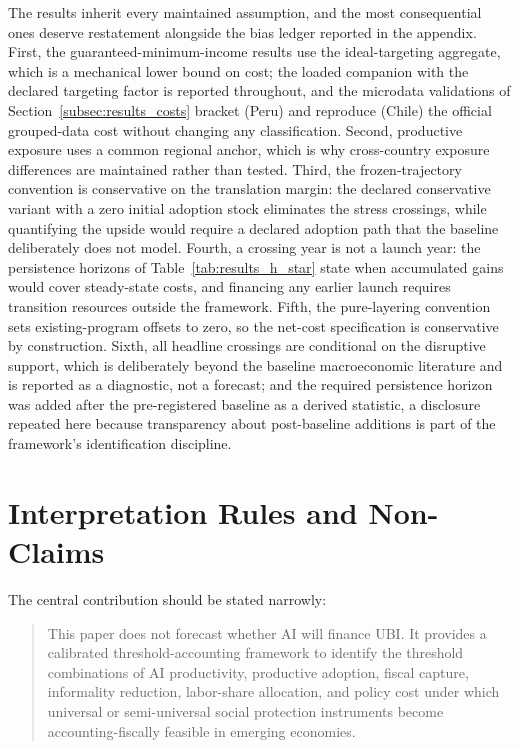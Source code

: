 \documentclass[11pt,a4paper]{article}
\begin{document}
The results inherit every maintained assumption, and the most consequential ones deserve
restatement alongside the bias ledger reported in the
appendix. First, the guaranteed-minimum-income results use the ideal-targeting aggregate,
which is a mechanical lower bound on cost; the loaded companion with the declared targeting
factor is reported throughout, and the microdata validations of Section~\ref{subsec:results_costs} bracket
(Peru) and reproduce (Chile) the official grouped-data cost without changing any
classification. Second, productive exposure uses a common regional anchor, which
is why cross-country exposure differences are maintained rather than tested. Third, the
frozen-trajectory convention is conservative on the translation margin: the declared
conservative variant with a zero initial adoption stock eliminates the stress crossings,
while quantifying the upside would require a declared adoption path that the baseline
deliberately does not model. Fourth, a crossing year is not a launch year: the persistence
horizons of Table~\ref{tab:results_h_star} state when accumulated gains would cover
steady-state costs, and financing any earlier launch requires transition resources outside
the framework. Fifth, the pure-layering convention sets existing-program offsets to zero,
so the net-cost specification is conservative by construction. Sixth, all headline
crossings are conditional on the disruptive support, which is deliberately beyond the
baseline macroeconomic literature and is reported as a diagnostic, not a forecast; and the
required persistence horizon was added after the pre-registered baseline as a derived
statistic, a disclosure repeated here because transparency about post-baseline additions is
part of the framework's identification discipline.

\section{Interpretation Rules and Non-Claims}\label{sec:claims}

The central contribution should be stated narrowly:
\begin{quote}
This paper does not forecast whether AI will finance UBI. It provides a calibrated threshold-accounting framework to identify the threshold combinations of AI productivity, productive adoption, fiscal capture, informality reduction, labor-share allocation, and policy cost under which universal or semi-universal social protection instruments become accounting-fiscally feasible in emerging economies.
\end{quote}
\end{document}
